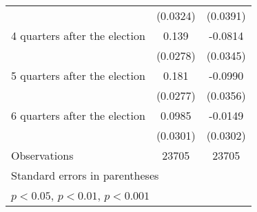 \begin{table}[htbp]
\begin{tabular}{l*{2}{c}}
                    &    (0.0324)         &    (0.0391)         \\
[0,12em]
 4 quarters after the election&       0.139\sym{***}&     -0.0814\sym{*}  \\
                    &    (0.0278)         &    (0.0345)         \\
[0,12em]
 5 quarters after the election&       0.181\sym{***}&     -0.0990\sym{**} \\
                    &    (0.0277)         &    (0.0356)         \\
[0,12em]
 6 quarters after the election&      0.0985\sym{**} &     -0.0149         \\
                    &    (0.0301)         &    (0.0302)         \\
\hline
Observations        &       23705         &       23705         \\
\hline\hline
\multicolumn{3}{l}{ Standard errors in parentheses}\\
\multicolumn{3}{l}{ \sym{*} \(p<0.05\), \sym{**} \(p<0.01\), \sym{***} \(p<0.001\)}\\
\end{tabular}
\end{table}
